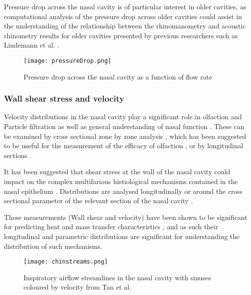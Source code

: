 Pressure drop across the nasal cavity is of particular interest in older cavities, as computational analysis of the pressure drop across older cavities could assist in the understanding of the relationship between the rhinomanometry and acoustic rhinometry results for older cavities presented by previous researchers such as Lindemann et al. \cite{Lindemann2008}.

\begin{figure}
  \centering
  \texttt{[image: pressureDrop.png]}
  \caption{Pressure drop across the nasal cavity as a function of flow rate} \label{fig:pvf}
\centering
\end{figure}

 \subsubsection{Wall shear stress and velocity}

Velocity distributions in the nasal cavity play a significant role in olfaction \cite{Ishikawa2009} and Particle filtration \cite{Inthavong2006, Wang2009a} as well as general understanding of nasal function \cite{Keyhani1995, Zhu2011, Lintermann2013}. 
These can be examined by cross sectional zone by zone analysis \cite{Keyhani1995, Zhu2011}, which has been suggested to be useful for the measurement of the efficacy of olfaction \cite{Zhu2011}, or by longitudinal sections \cite{Lintermann2013,Taylor2010}. 

It has been suggested that shear stress at the wall of the nasal cavity could impact on the complex multifarious histiological mechanisms contained in the nasal epithelium \cite{Elad2006}.
Distributions are analysed longitudinally \cite{Wen2008} or around the cross sectional parameter of the relevant section of the nasal cavity \cite{Burgos2014}. 

These measurements (Wall shear and velocity) have been shown to be significant for predicting heat and mass transfer characteristics \cite{Taylor2010}, and as such their longitudinal and parametric distributions are significant for understanding the distribution of such mechanisms. 

\begin{figure}
  \centering
  \texttt{[image: chinstreams.png]}
  \caption{Inspiratory airflow streamlines in the nasal cavity with sinuses coloured by velocity from Tan et al. \cite{Tan2012}} \label{fig:chinstreams}
\centering
\end{figure}

